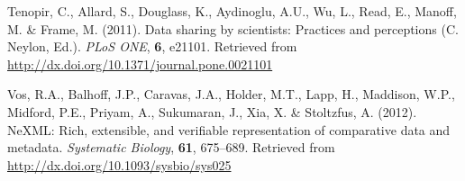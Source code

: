 \documentclass[author-year, review, 11pt]{components/elsarticle} %
\begin{document}
Tenopir, C., Allard, S., Douglass, K., Aydinoglu, A.U., Wu, L., Read,
E., Manoff, M. \& Frame, M. (2011). Data sharing by scientists:
Practices and perceptions (C. Neylon, Ed.). \emph{PLoS ONE}, \textbf{6},
e21101. Retrieved from
\url{http://dx.doi.org/10.1371/journal.pone.0021101}

Vos, R.A., Balhoff, J.P., Caravas, J.A., Holder, M.T., Lapp, H.,
Maddison, W.P., Midford, P.E., Priyam, A., Sukumaran, J., Xia, X. \&
Stoltzfus, A. (2012). NeXML: Rich, extensible, and verifiable
representation of comparative data and metadata. \emph{Systematic
Biology}, \textbf{61}, 675--689. Retrieved from
\url{http://dx.doi.org/10.1093/sysbio/sys025}
\end{document}
